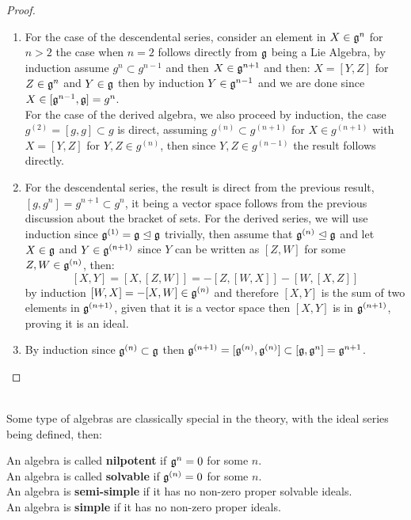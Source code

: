 \begin{proof}
	\begin{enumerate}[label=(\alph*)]
		\item For the case of the descendental series, consider an element in $X \in \mathfrak{g}^n$ for $n > 2$ the case when $n=2$ follows directly from $\mathfrak{g}$ being a Lie Algebra, by induction assume $g^{n}\subset g^{n-1}$ and then $X \in \mathfrak{g}^{n+1}$ and then: $X=[Y,Z]$ for $Z \in \mathfrak{g}^{n}$ and $Y \in \mathfrak{g}$ then by induction $Y\in \mathfrak{g}^{n-1}$ and we are done since $X \in [\mathfrak{g}^{n-1},\mathfrak{g}] = g^{n}$.\\
		For the case of the derived algebra, we also proceed by induction, the case $g^{(2)} = [g,g] \subset g$ is direct, assuming $g^{(n)} \subset g^{(n+1)}$ for $X \in g^{(n+1)}$ with $X=[Y,Z]$ for $Y,Z \in g^{(n)}$, then since $Y,Z \in g^{(n-1)}$ the result follows directly.\\
	\item For the descendental series, the result is direct from the previous result, $[g,g^n] = g^{n+1} \subset g^n$, it being a vector space follows from the previous discussion about the bracket of sets. For the derived series, we will use induction since $\mathfrak{g}^{(1)}=\mathfrak{g} \trianglelefteq \mathfrak{g}$ trivially, then assume that $\mathfrak{g}^{(n)} \trianglelefteq \mathfrak{g}$ and let $X \in \mathfrak{g}$ and $Y \in \mathfrak{g}^{(n+1)}$ since $Y$ can be written as $[Z,W]$ for some $Z,W \in \mathfrak{g}^{(n)}$, then:
	$$[X,Y] = [X,[Z,W]] = -[Z,[W,X]]-[W,[X,Z]] $$ 
	by induction $[W,X] = -[X,W] \in \mathfrak{g}^{(n)}$ and therefore $[X,Y]$ is the sum of two elements in $\mathfrak{g}^{(n+1)}$, given that it is a vector space then $[X,Y]$ is in $\mathfrak{g}^{(n+1)}$, proving it is an ideal.
	\item By induction since $\mathfrak{g}^{(n)}\subset \mathfrak{g}$ then $\mathfrak{g}^{(n+1)} = [\mathfrak{g}^{(n)},\mathfrak{g}^{(n)}] \subset [\mathfrak{g},\mathfrak{g}^n] = \mathfrak{g}^{n+1}$.
	\end{enumerate}
\end{proof}\\
Some type of algebras are classically special in the theory, with the ideal series being defined, then:
\begin{defi}
\begin{itemize}
 An algebra is called \textbf{nilpotent} if $\mathfrak{g}^n = 0$ for some $n$.\\
 An algebra is called \textbf{solvable} if $\mathfrak{g}^{(n)}=0$ for some $n$.\\
 An algebra is \textbf{semi-simple} if it has no non-zero proper solvable ideals.\\
 An algebra is \textbf{simple} if it has no non-zero proper ideals.
\end{itemize}
\label{algebratypes}
\end{defi}